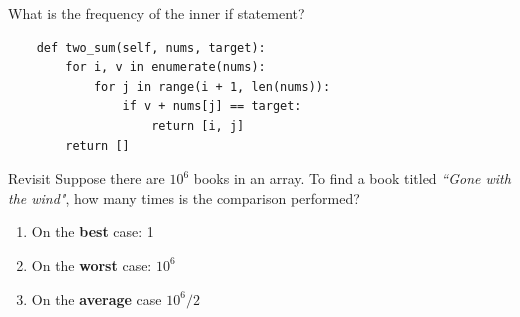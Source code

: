 \documentclass[aspectratio=169, 14pt]{beamer}
\begin{document}
\begin{frame}[fragile]

	{\large {}} What is the frequency of the inner \alert{if} statement?
	\begin{verbatim}
    def two_sum(self, nums, target):
        for i, v in enumerate(nums):
            for j in range(i + 1, len(nums)):
                if v + nums[j] == target:
                    return [i, j]
        return []
    \end{verbatim}


\end{frame}

\begin{frame}[fragile]
	\begin{block}{Revisit}
		Suppose there are $10^6$ books in an array. To find a book titled \emph{``Gone with the wind"}, how many times is the comparison performed?
		\begin{enumerate}
			\item On the \textbf{best} case: 1
			\item On the \textbf{worst} case: $10^6$
			\item On the \textbf{average} case $10^6/2$
		\end{enumerate}
	\end{block}


\end{frame}
\end{document}
